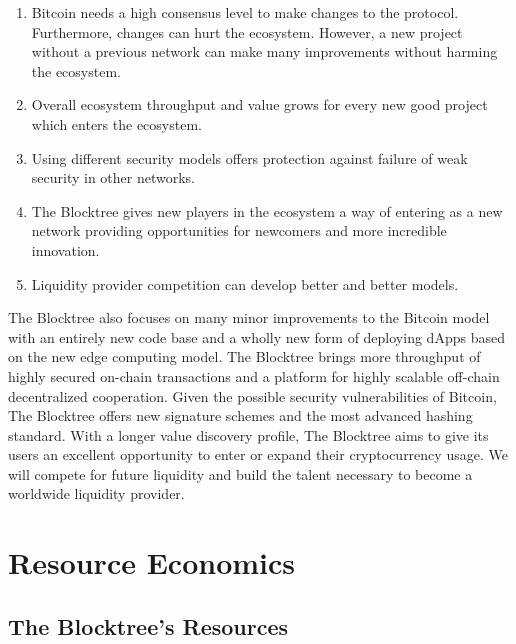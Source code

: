 \documentclass[12pt]{article}
\begin{document}
\begin{enumerate}

\item Bitcoin needs a high consensus level to make changes to the protocol. Furthermore, changes can hurt the ecosystem. However, a new project without a previous network can make many improvements without harming the ecosystem.

\item Overall ecosystem throughput and value grows for every new good project which enters the ecosystem. 

\item Using different security models offers protection against failure of weak security in other networks. 

\item The Blocktree gives new players in the ecosystem a way of entering as a new network providing opportunities for newcomers and more incredible innovation. 

\item Liquidity provider competition can develop better and better models.

\end{enumerate}

The Blocktree also focuses on many minor improvements to the Bitcoin model with an entirely new code base and a wholly new form of deploying dApps based on the new edge computing model. The Blocktree brings more throughput of highly secured on-chain transactions and a platform for highly scalable off-chain decentralized cooperation. Given the possible security vulnerabilities of Bitcoin, The Blocktree offers new signature schemes and the most advanced hashing standard. With a longer value discovery profile, The Blocktree aims to give its users an excellent opportunity to enter or expand their cryptocurrency usage. We will compete for future liquidity and build the talent necessary to become a worldwide liquidity provider.





\section{Resource Economics}

\subsection{The Blocktree's Resources}
\end{document}
